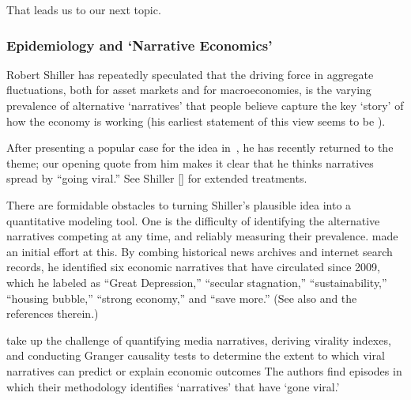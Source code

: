 That leads us to our next topic.


\subsubsection{Epidemiology and `Narrative Economics'}\label{narrativeApproach}

Robert Shiller has repeatedly speculated that the driving force in aggregate fluctuations, both for asset markets and for macroeconomies, is the varying prevalence of alternative `narratives' that people believe capture the key `story' of how the economy is working (his earliest statement of this view seems to be \href{https://www.jstor.org/stable/2117915}{\cite{shiller1995conversation}}).

After presenting a popular case for the idea in~\cite{akerlof2010animal}, he has recently returned to the theme; our opening quote from him makes it clear that he thinks narratives spread by ``going viral.''  See Shiller [\citeyear{shiller2017narrative,shiller_narrative_2019}] for extended treatments.

There are formidable obstacles to turning Shiller's plausible idea into a quantitative modeling tool.  One is the difficulty of identifying the alternative narratives competing at any time, and reliably measuring their prevalence.
\href{https://github.com/iworld1991/EpiExp/blob/master/Literature/shiller2020popular.pdf}{\cite{shiller2020popular}} made an initial effort at this.  By combing historical news archives and internet search records, he identified six economic narratives that have circulated since 2009, which he labeled as ``Great Depression,'' ``secular stagnation,'' ``sustainability,'' ``housing bubble,'' ``strong economy,'' and ``save more.''  (See also  \cite{ash2021text} and the references therein.)

\cite{larsen2019business} take up the challenge of quantifying media narratives, deriving virality indexes, and conducting Granger causality tests to determine the extent to which viral narratives can predict or explain economic outcomes  The authors find episodes in which their methodology identifies `narratives' that have `gone viral.'  %

